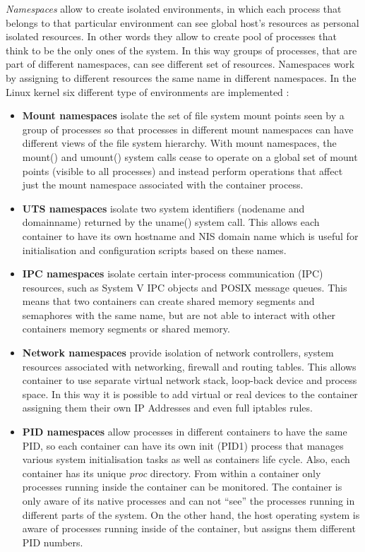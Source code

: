 \documentclass[a4paper,12pt]{article}
\begin{document}
\textit{Namespaces} allow to create isolated environments, in which each process
that belongs to that particular environment can see global host's resources as
personal isolated resources. In other words they allow to create pool of
processes that think to be the only ones of the system. In this way groups of
processes, that are part of different namespaces, can see different set of
resources. Namespaces work by assigning to different resources the same name in
different namespaces. In the Linux kernel six different type of environments are
implemented \cite{red_hat_introduction_to_namespaces}:
  \begin{itemize}
    \item \textbf{Mount namespaces} isolate the set of file system mount points
    seen by a group of processes so that processes in different mount namespaces
    can have different views of the file system hierarchy. With mount
    namespaces, the mount() and umount() system calls cease to operate on a
    global set of mount points (visible to all processes) and instead perform
    operations that affect just the mount namespace associated with the
    container process. 
    \item \textbf{UTS namespaces} isolate two system identifiers (nodename and
    domainname) returned by the uname() system call. This allows each container
    to have its own hostname and NIS domain name which is useful for
    initialisation and configuration scripts based on these names. 
    \item \textbf{IPC namespaces} isolate certain inter-process communication
    (IPC) resources, such as System V IPC objects and POSIX message queues. This
    means that two containers can create shared memory segments and semaphores
    with the same name, but are not able to interact with other containers
    memory segments or shared memory. 
    \item \textbf{Network namespaces} provide isolation of network controllers,
    system resources associated with networking, firewall and routing tables.
    This allows container to use separate virtual network stack, loop-back device
    and process space. In this way it is possible to add virtual or real devices
    to the container assigning them their own IP Addresses and even full iptables
    rules. 
    \item \textbf{PID namespaces} allow processes in different containers to
    have the same PID, so each container can have its own init (PID1) process
    that manages various system initialisation tasks as well as containers life
    cycle. Also, each container has its unique \textit{\/proc} directory. From
    within a container only processes running inside the container can be
    monitored. The container is only aware of its native processes and can not
    ``see'' the processes running in different parts of the system. On the other
    hand, the host operating system is aware of processes running inside of the
    container, but assigns them different PID numbers.
  \end{itemize} 
\end{document}
